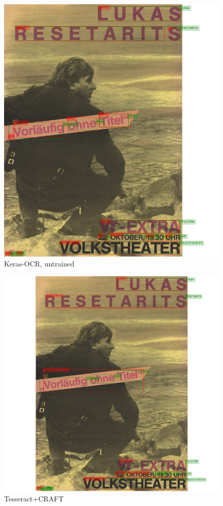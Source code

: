\begin{figure}[hbtp!]
    \centering
   \includegraphics[scale=0.3]{obrazky/plakaty/result_kerasOCR_vienna2_nosplit-83.png}
    \caption{Keras-OCR, untrained}
    \label{Im3:ex:keras}
\end{figure}

\begin{figure}[hbtp!]
    \centering
    \includegraphics[scale=0.3]{obrazky/plakaty/result_carfttesseract_vienna2_split_special_snesitive-83.png}
    \caption{Tesseract+CRAFT}
    \label{Im3:ex:craft}
\end{figure}

